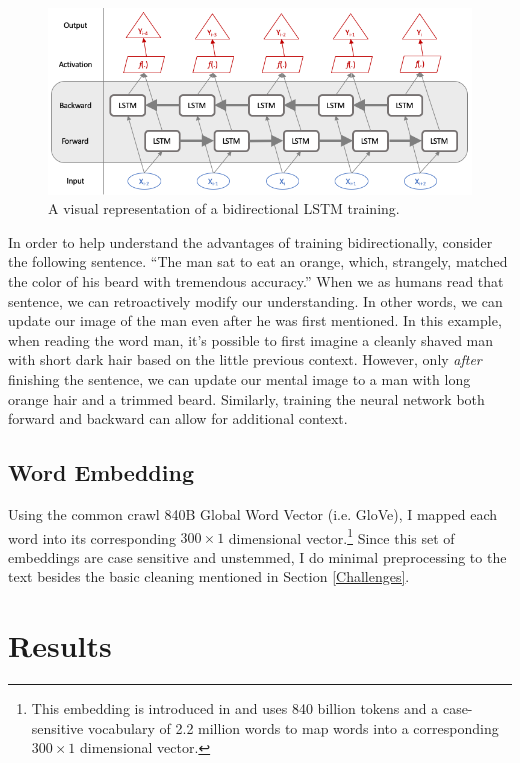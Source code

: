 \documentclass{article}
\begin{document}
	 \begin{figure}[H]
	 	\includegraphics[width=\textwidth]{figures/images/bidirectional-net.png}
	 	\caption{A visual representation of a bidirectional LSTM training.}
	 	\label{fig:bidirectional}
	 \end{figure}
	
	In order to help understand the advantages of training bidirectionally, consider the following sentence. ``The man sat to eat an orange, which, strangely, matched the color of his beard with tremendous accuracy.'' When we as humans read that sentence, we can retroactively modify our understanding. In other words, we can update our image of the man even after he was first mentioned. In this example, when reading the word man, it's possible to first imagine a cleanly shaved man with short dark hair based on the little previous context. However, only \textit{after} finishing the sentence, we can update our mental image to a man with long orange hair and a trimmed beard. Similarly, training the neural network both forward and backward can allow for additional context. 
	
	\subsection{Word Embedding}
	Using the common crawl 840B Global Word Vector (i.e. GloVe), I mapped each word into its corresponding $300 \times 1$ dimensional vector.\footnote{This embedding is introduced in \citet{pennington2014glove} and uses 840 billion tokens and a case-sensitive vocabulary of 2.2 million words to map words into a corresponding $300 \times 1$ dimensional vector.} Since this set of embeddings are case sensitive and unstemmed, I do minimal preprocessing to the text besides the basic cleaning mentioned in Section \ref{Challenges}.
	
	
		
	\section{Results}
	
\end{document}
